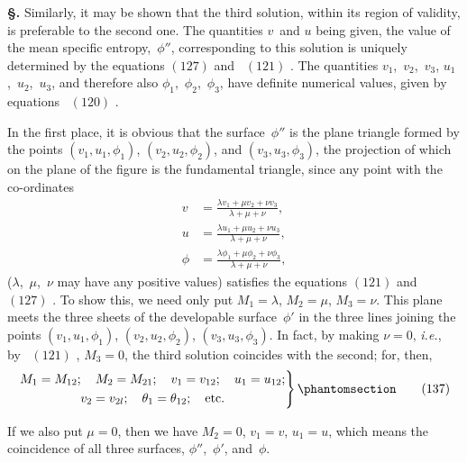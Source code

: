 \documentclass[12pt]{book}[2005/09/16]
\newcommand{\Section}[1]{
  \medskip\par\textbf{§\;#1}
  \label{section:#1}
}
\newcommand{\Tag}[1]{%
  \phantomsection\label{eqn:#1}\tag*{\ensuremath{#1}}%
}
\newcommand{\Eq}[1]{%
  \hyperref[eqn:#1]{\ensuremath{#1}}%
}
\newcommand{\PageSep}[1]{\ignorespaces}
\newcommand{\ie}{\emph{i.e.}}
\begin{document}
\Section{195.} Similarly, it may be shown that the third solution,
within its region of validity, is preferable to the second
one. The quantities $v$~and $u$ being given, the value of the
mean specific entropy,~$\phi''$, corresponding to this solution is
uniquely determined by the equations \Eq{(127)} and~\Eq{(121)}. The
quantities $v_{1}$,~$v_{2}$,~$v_{3}$, $u_{1}$,~$u_{2}$,~$u_{3}$, and therefore also $\phi_{1}$,~$\phi_{2}$,~$\phi_{3}$,
have definite numerical values, given by equations~\Eq{(120)}.

In the first place, it is obvious that the surface~$\phi''$ is
the plane triangle formed by the points $(v_{1}, u_{1}, \phi_{1})$, $(v_{2}, u_{2}, \phi_{2})$,
and $(v_{3}, u_{3}, \phi_{3})$, the projection of which on the plane of
the figure is the fundamental triangle, since any point with
the co-ordinates
\begin{align*}
v &= \frac{\lambda v_{1} + \mu v_{2} + \nu v_{3}}{\lambda + \mu + \nu}, \\
u &= \frac{\lambda u_{1} + \mu u_{2} + \nu u_{3}}{\lambda + \mu + \nu}, \\
\phi &= \frac{\lambda \phi_{1} + \mu \phi_{2} + \nu \phi_{3}}{\lambda + \mu + \nu},
\end{align*}
($\lambda$,~$\mu$,~$\nu$ may have any positive values) satisfies the equations
\Eq{(121)} and~\Eq{(127)}. To show this, we need only put $M_{1} = \lambda$,
\PageSep{169}
$M_{2} = \mu$, $M_{3} = \nu$. This plane meets the three sheets of the
developable surface~$\phi'$ in the three lines joining the points
$(v_{1}, u_{1}, \phi_{1})$, $(v_{2}, u_{2}, \phi_{2})$, $(v_{3}, u_{3}, \phi_{3})$. In fact, by making
$\nu = 0$, \ie, by~\Eq{(121)}, $M_{3} = 0$, the third solution coincides
with the second; for, then,
\[
\left.
\begin{gathered}
M_{1} = M_{12};\quad
M_{2} = M_{21};\quad
v_{1} = v_{12};\quad
u_{1} = u_{12}; \\
v_{2} = v_{2l};\quad
\theta_{1} = \theta_{12};\quad\text{etc.}
\end{gathered}
\right\}
\Tag{(137)}
\]

If we also put $\mu = 0$, then we have $M_{2} = 0$, $v_{1} = v$,
$u_{1} = u$, which means the coincidence of all three surfaces,
$\phi''$,~$\phi'$, and~$\phi$.
\end{document}
